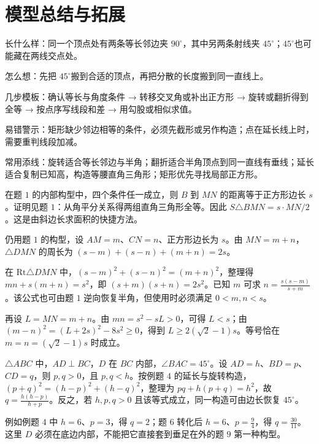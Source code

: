 \section{模型总结与拓展}
\ifteachernotes
{}

长什么样：同一个顶点处有两条等长邻边夹 \(90^\circ \)，其中另两条射线夹 \(45^\circ \)；\(45^\circ \)也可能藏在两线交点处。

怎么想：先把 \(45^\circ \)搬到合适的顶点，再把分散的长度搬到同一直线上。

几步模板：确认等长与角度条件 → 转移交叉角或补出正方形 → 旋转或翻折得到全等 → 按点序写线段和差 → 用勾股或相似求值。

易错警示：矩形缺少邻边相等的条件，必须先截形或另作构造；点在延长线上时，需要重判线段加减。

常用添线：旋转适合等长邻边与半角；翻折适合半角顶点到同一直线有垂线；延长适合复制已知高，构造等腰直角三角形；矩形优先寻找局部正方形。


在题 \(1\) 的内部构型中，四个条件任一成立，则 \(B\) 到 \(MN\) 的距离等于正方形边长 \(s\)。证明见题 \(1\)：从角平分关系得两组直角三角形全等。因此 \(S\triangle BMN=s\cdot MN/2\)。这是由斜边长求面积的快捷方法。


仍用题 \(1\) 的构型，设 \(AM=m\)、\(CN=n\)、正方形边长为 \(s\)。由 \(MN=m+n\)，\(\triangle DMN\) 的周长为 \((s-m)+(s-n)+(m+n)=2s\)。

在 \(\mathrm{Rt}\triangle DMN\) 中，\((s-m)^2+(s-n)^2=(m+n)^2\)，整理得 \(mn+s(m+n)=s^2\)，即 \((s+m)(s+n)=2s^2\)。已知 \(m\) 可求 \(n=\frac{s(s-m)}{s+m}\)。该公式也可由题 \(1\) 逆向恢复半角，但使用时必须满足 \(0<m,n<s\)。

再设 \(L=MN=m+n\)。由 \(mn=s^2-sL>0\)，可得 \(L<s\)；由 \((m-n)^2=(L+2s)^2-8s^2\ge 0\)，得到 \(L\ge 2(\sqrt{2}-1)s\)。等号恰在 \(m=n=(\sqrt{2}-1)s\) 时成立。

\clearpage
{}

\(\triangle ABC\) 中，\(AD\perp BC\)，\(D\) 在 \(BC\) 内部，\(\angle BAC=45^\circ \)。设 \(AD=h\)、\(BD=p\)、\(CD=q\)，则 \(p,q>0\)，且 \(p,q<h\)。按例题 \(4\) 的延长与旋转构造，\((p+q)^2=(h-p)^2+(h-q)^2\)，整理为 \(pq+h(p+q)=h^2\)，故 \(q=\frac{h(h-p)}{h+p}\)。反之，若 \(h,p,q>0\) 且该等式成立，同一构造可由边长恢复 \(45^\circ \)。

例如例题 \(4\) 中 \(h=6\)、\(p=3\)，得 \(q=2\)；题 \(6\) 转化后 \(h=6\)、\(p=\frac{9}{4}\)，得 \(q=\frac{30}{11}\)。这里 \(D\) 必须在底边内部，不能把它直接套到垂足在外的题 \(9\) 第一种构型。

